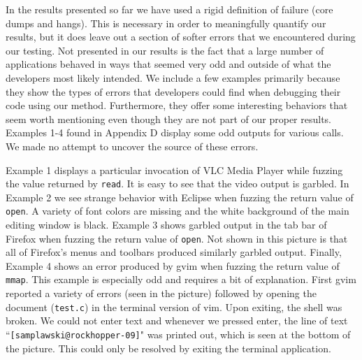 In the results presented so far we have used a rigid definition of failure (core dumps and hangs). This is necessary in order to meaningfully quantify our results, but it does leave out a section of softer errors that we encountered during our testing. Not presented in our results is the fact that a large number of applications behaved in ways that seemed very odd and outside of what the developers most likely intended. We include a few examples primarily because they show the types of errors that developers could find when debugging their code using our method. Furthermore, they offer some interesting behaviors that seem worth mentioning even though they are not part of our proper results. Examples 1-4 found in Appendix D display some odd outputs for various calls. We made no attempt to uncover the source of these errors.

Example 1 displays a particular invocation of VLC Media Player while fuzzing the value returned by \texttt{read}. It is easy to see that the video output is garbled. In Example 2 we see strange behavior with Eclipse when fuzzing the return value of \texttt{open}. A variety of font colors are missing and the white background of the main editing window is black. Example 3 shows garbled output in the tab bar of Firefox when fuzzing the return value of \texttt{open}. Not shown in this picture is that all of Firefox's menus and toolbars produced similarly garbled output. Finally, Example 4 shows an error produced by gvim when fuzzing the return value of \texttt{mmap}. This example is especially odd and requires a bit of explanation. First gvim reported a variety of errors (seen in the picture) followed by opening the document (\texttt{test.c}) in the terminal version of vim. Upon exiting, the shell was broken. We could not enter text and whenever we pressed enter, the line of text ``\texttt{[samplawski@rockhopper-09]}" was printed out, which is seen at the bottom of the picture. This could only be resolved by exiting the terminal application.